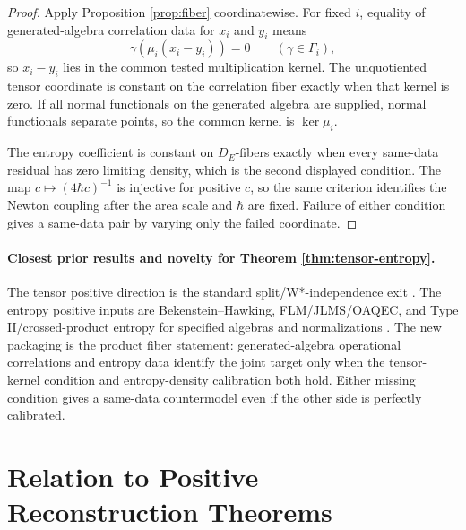 \documentclass[12pt]{article}
\theoremstyle{definition}
\theoremstyle{remark}
\begin{document}
\begin{proof}
Apply Proposition \ref{prop:fiber} coordinatewise.  For fixed \(i\), equality
of generated-algebra correlation data for \(x_i\) and \(y_i\) means
\[
  \gamma(\mu_i(x_i-y_i))=0\qquad(\gamma\in\Gamma_i),
\]
so \(x_i-y_i\) lies in the common tested multiplication kernel.  The
unquotiented tensor coordinate is constant on the correlation fiber exactly
when that kernel is zero.  If all normal functionals on the generated algebra
are supplied, normal functionals separate points, so the common kernel is
\(\ker\mu_i\).

The entropy coefficient is constant on \(D_E\)-fibers exactly when every
same-data residual has zero limiting density, which is the second displayed
condition.  The map \(c\mapsto(4\hbar c)^{-1}\) is injective for positive
\(c\), so the same criterion identifies the Newton coupling after the area
scale and \(\hbar\) are fixed.  Failure of either condition gives a same-data
pair by varying only the failed coordinate.
\end{proof}

\paragraph{Closest prior results and novelty for Theorem
\ref{thm:tensor-entropy}.}
The tensor positive direction is the standard split/W*-independence exit
\cite{DoplicherLongoSplit,BuchholzWichmann,WernerSplit}.  The entropy positive
inputs are Bekenstein--Hawking, FLM/JLMS/OAQEC, and Type II/crossed-product
entropy for specified algebras and normalizations
\cite{Bekenstein,Hawking,FLM,JLMS,HarlowRT,DHW,WittenCrossed,LongoWitten,CLPW,
CPW}.  The new packaging is the product fiber statement: generated-algebra
operational correlations and entropy data identify the joint target only when
the tensor-kernel condition and entropy-density calibration both hold.  Either
missing condition gives a same-data countermodel even if the other side is
perfectly calibrated.

\section{Relation to Positive Reconstruction Theorems}
\end{document}
